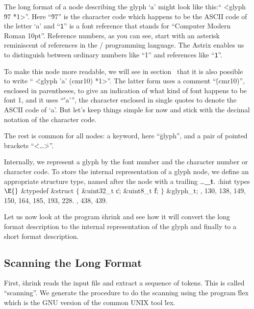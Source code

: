 The long format of a node describing the glyph `a'
might look like this:`` \.{<glyph} \.{97} \.{*1>}''.
Here ``\.{97}'' is the character code which
happens to be the ASCII code of the letter `a' and ``{\tt *1}'' is a font reference
that stands for ``Computer Modern Roman 10pt''.
Reference numbers, as you can see,
start with an asterisk reminiscent of references in the \CEE/ programming language.
The Astrix enables us to distinguish between ordinary numbers like ``\.{1}'' and references like ``{\tt *1}''.

To make this node more readable, we will see in section~ that it is also
possible to write `` \.{<glyph 'a' (cmr10) *1>}''.
The latter form uses a comment ``\.{(cmr10)}'', enclosed in parentheses, to
give an indication of what kind of font happens to be font 1, and it uses ``\.{'a'}'',
the character enclosed in single quotes to denote the ASCII code of `a'.
But let's keep things simple for now and stick with the decimal notation of the character code.

The rest is common for all nodes: a keyword, here ``\.{glyph}'', and a pair of pointed brackets ``\.{<}\dots\.{>}''.

Internally, we represent a glyph by the font number
and the character number or character code.
To store the internal representation of a glyph node,
we define an appropriate structure type, named after the node with a trailing {\dots\bf\_t}.
\Y\B\4:hint types\X${}\E{}$\6
\&{typedef} \&{struct} ${}\{{}$\5
\1\&{uint32\_t} \|c;\5
\&{uint8\_t} \|f;\5
\2${}\}{}$ \&{glyph\_t};
, 130, 138, 149, 150, 164, 185, 193, 228.
, 438, 439.\Y
\fi


Let us now look at the program \.{shrink} and see how it will convert the long format description
to the internal representation of the glyph and finally to a short format description.


\subsection{Scanning the Long Format}
First, \.{shrink} reads the input file and extract a sequence of tokens. This is called ``scanning''.
We generate the procedure to do the scanning using the program \.{flex}\cite{JL:flexbison} which is the
GNU version of the common UNIX tool \.{lex}\cite{JL:lexyacc}.

